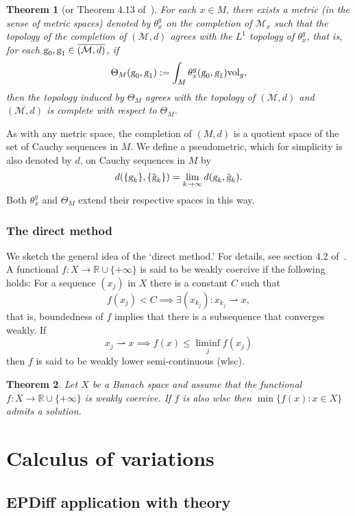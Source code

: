 \documentclass{article}
\theoremstyle{plain}
\newtheorem{teo}{Theorem}[section]
\theoremstyle{definition}
\numberwithin{equation}{section}
\newcommand{\R}{\ensuremath{\mathbb{R}}}
\newcommand{\g}{\ensuremath{\textsl{g}}}
\newcommand{\Vol}{\ensuremath{\mathrm{vol}}}
\newcommand{\cM}{\ensuremath{\mathcal{M}}}
\begin{document}
\begin{teo}[{or Theorem 4.13 of~\cite{clarke2010riemannian}}]
	For each $x\in M$, there exists a metric (in the sense of metric spaces) denoted by $\theta_x^g$ on the completion of $\cM_x$ such that the topology of the completion of $(\cM,d)$ agrees with the $L^1$ topology of $\theta_x^g$, that is, for each $\g_0,\g_1\in \overline{(\cM,d)}$, if
	\[
	\Theta_M(\g_0,\g_1):=\int_M \theta_x^g(\g_0,\g_1)\Vol_g,
	\]
	then the topology induced by $\Theta_M$ agrees with the topology of $\overline{(\cM,d)}$ and $\overline{(\cM,d)}$ is complete with respect to $\Theta_M$.
\end{teo}

As with any metric space, the completion of $(M,d)$ is a quotient space of the set of Cauchy sequences in $M$. We define a pseudometric, which for simplicity is also denoted by $d$, on Cauchy sequences in $M$ by 
\[
d(\{\g_k\},\{\tilde{\g}_k\})=\lim_{k\to\infty} d(\g_k,\tilde{\g}_k).
\]
Both $\theta_x^g$ and $\Theta_M$ extend their respective spaces in this way.

\subsubsection*{The direct method}
We sketch the general idea of the `direct method.' For details, see section 4.2 of~\cite{chang2005methods}. A functional $f:X\to\R\cup\{+\infty\}$ is said to be weakly coercive if the following holds: For a sequence $(x_j)$ in $X$ there is a constant $C$ such that
\[
f(x_j)<C \implies \exists (x_{k_j}) : x_{k_j}\rightharpoonup x,
\]
that is, boundedness of $f$ implies that there is a subsequence that converges weakly. If
\[
x_j\rightharpoonup x \implies f(x)\leq \liminf_j f(x_j)
\]
then $f$ is said to be weakly lower semi-continuous (wlsc).

\begin{teo}
	Let $X$ be a Banach space and assume that the functional  $f:X\to\R\cup\{+\infty\}$ is weakly coercive. If $f$ is also wlsc then $\min\{f(x):x\in X\}$ admits a solution.
\end{teo}



\newpage
\appendix
\section{Calculus of variations}
\subsection{EPDiff application with theory}
\end{document}
